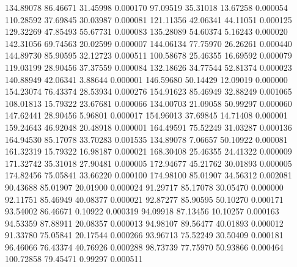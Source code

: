       134.89078       86.46671       31.45998       0.000170
       97.09519       35.31018       13.67258       0.000054
      110.28592       37.69845       30.03987       0.000081
      121.11356       42.06341       44.11051       0.000125
      129.32269       47.85493       55.67731       0.000083
      135.28089       54.60374        5.16243       0.000020
      142.31056       69.74563       20.02599       0.000007
      144.06134       77.75970       26.26261       0.000440
      144.89730       85.90595       32.12723       0.000511
      100.58678       25.46355       16.69592       0.000079
      119.03199       28.90456       37.37559       0.000084
      132.18626       34.77544       52.81374       0.000023
      140.88949       42.06341        3.88644       0.000001
      146.59680       50.14429       12.09019       0.000000
      154.23074       76.43374       28.53934       0.000276
      154.91623       85.46949       32.88249       0.001065
      108.01813       15.79322       23.67681       0.000066
      134.00703       21.09058       50.99297       0.000060
      147.62441       28.90456        5.96801       0.000017
      154.96013       37.69845       14.71408       0.000001
      159.24643       46.92048       20.48918       0.000001
      164.49591       75.52249       31.03287       0.000136
      164.94530       85.17078       33.70283       0.001535
      134.89078        7.06657       50.10922       0.000081
      161.32319       15.79322       16.98187       0.000021
      168.30408       25.46355       24.41322       0.000009
      171.32742       35.31018       27.90481       0.000005
      172.94677       45.21762       30.01893       0.000005
      174.82456       75.05841       33.66220       0.000100
      174.98100       85.01907       34.56312       0.002081
       90.43688       85.01907       20.01900       0.000024
       91.29717       85.17078       30.05470       0.000000
       92.11751       85.46949       40.08377       0.000021
       92.87277       85.90595       50.10270       0.000171
       93.54002       86.46671        0.10922       0.000319
       94.09918       87.13456       10.10257       0.000163
       94.53359       87.88911       20.08357       0.000013
       94.98107       89.56477       40.01893       0.000012
       91.33780       75.05841       20.17544       0.000266
       93.96713       75.52249       30.50409       0.000181
       96.46066       76.43374       40.76926       0.000288
       98.73739       77.75970       50.93866       0.000464
      100.72858       79.45471        0.99297       0.000511
